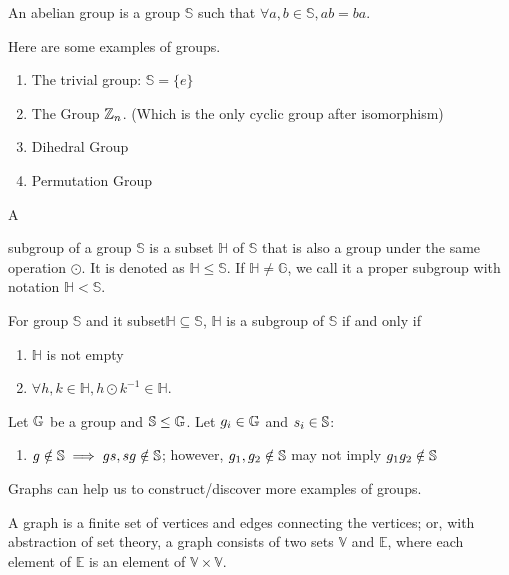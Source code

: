 \documentclass[../note.tex]{subfiles}
\begin{document}
\begin{definition}
	An abelian group is a group $\mathbb{S}$ such that $\forall a, b \in \mathbb{S}, a  b = b  a$.
\end{definition}

Here are some examples of groups. 
\begin{enumerate}
	\item The trivial group: $\mathbb{S}=\{e\}$
	\item The Group $\mathbb{Z}_n$. (Which is the only cyclic group after isomorphism)
	\item Dihedral Group 
	\item Permutation Group
\end{enumerate}

\begin{definition}[Subgroup]
	\hypertarget{def:subgroup}{A} subgroup of a group $\mathbb{S}$ is a subset $\mathbb{H}$ of $\mathbb{S}$ that is also a group under the same operation $\odot$. It is denoted as $ \mathbb{H}\leq \mathbb{S}$. If $\mathbb{H} \neq \mathbb{G}$, we call it a proper subgroup with notation $\mathbb{H}< \mathbb{S}$.
\end{definition}

\begin{theorem} 
	For group $\mathbb{S}$ and it subset$\mathbb{H} \subseteq \mathbb{S}$, $\mathbb{H}$ is a subgroup of $\mathbb{S}$ if and only if 
	\begin{enumerate}
		\item $\mathbb{H}$ is not empty 
		\item $\forall h,k \in \mathbb{H}, h\odot k^{-1} \in \mathbb{H}$.
	\end{enumerate}
\end{theorem}

\begin{theorem} 
	Let $\mathbb{G}$ be a group and $\mathbb{S}\leq \mathbb{G}$. Let $g_i\in \mathbb{G}$ and $s_i \in \mathbb{S}$:
	\begin{enumerate}
		\item $g\notin \mathbb{S} \implies gs, sg \notin \mathbb{S}$; however, $g_1, g_2 \notin \mathbb{S}$ may not imply $g_1g_2 \notin \mathbb{S}$
	\end{enumerate}
\end{theorem}

Graphs can help us to construct/discover more examples of groups.

\begin{definition}[Graph]
	A graph is a finite set of vertices and edges connecting the vertices;
	or, with abstraction of set theory, a graph consists of two sets $\mathbb{V}$ and $\mathbb{E}$, where each element of $\mathbb{E}$ is an element of $\mathbb{V}\times \mathbb{V}.$
\end{definition}
\end{document}
